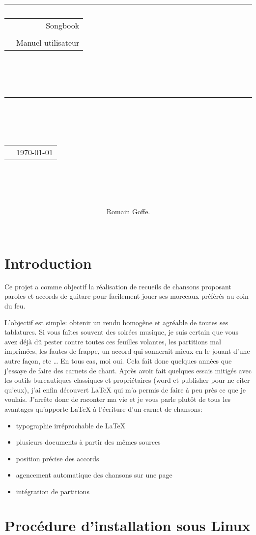 \documentclass[a4paper,twoside]{article}
\title{
{\rule{\larg}{1mm}}\vspace{7mm}
\begin{tabular}{p{4cm} r}
   & {\Huge {Songbook}} \\
   & \\
   & {\Large Manuel utilisateur}\\
\end{tabular}\\
\vspace{2mm}
{\rule{\larg}{1mm}}
\vspace{2mm} \\
\begin{tabular}{p{11cm} r}
   & {\large  \today}
\end{tabular}\\
\vspace{3.5cm}
}
\author{\begin{tabular}{p{13.7cm}}
Romain Goffe.
\end{tabular}\\
\hline }
\date{}
\begin{document}
\maketitle


\newpage
\tableofcontents
\newpage

\section*{Introduction}

Ce projet a comme objectif la réalisation de recueils de chansons
proposant paroles et accords de guitare pour facilement jouer ses
morceaux préférés au coin du feu.

L'objectif est simple: obtenir un rendu homogène et agréable de toutes
ses tablatures. Si vous faîtes souvent des soirées musique, je suis
certain que vous avez déjà dû pester contre toutes ces feuilles
volantes, les partitions mal imprimées, les fautes de frappe, un
accord qui sonnerait mieux en le jouant d'une autre façon, etc \dots
En tous cas, moi oui. Cela fait donc quelques années que j'essaye de
faire des carnets de chant. Après avoir fait quelques essais mitigés
avec les outils bureautiques classiques et propriétaires (word et
publisher pour ne citer qu'eux), j'ai enfin découvert LaTeX qui m'a
permis de faire à peu près ce que je voulais. J'arrête donc de
raconter ma vie et je vous parle plutôt de tous les avantages
qu'apporte LaTeX à l'écriture d'un carnet de chansons:

\begin{itemize}
\item typographie irréprochable de LaTeX 
\item plusieurs documents à partir des mêmes sources
\item position précise des accords
\item agencement automatique des chansons sur une page
\item intégration de partitions
\end{itemize}

\section{Procédure d'installation sous Linux}
\end{document}
